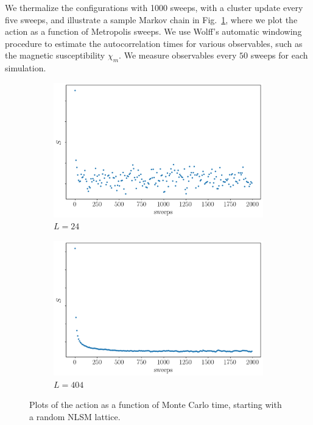 \documentclass[a4paper,11pt]{article}
\begin{document}
We thermalize the configurations with 1000 sweeps, with a cluster update every five sweeps, and illustrate a sample Markov chain in Fig.~\ref{fig:therm}, where we plot the action as a function of Metropolis sweeps. We use Wolff's automatic windowing procedure \cite{wolff2007} to estimate the autocorrelation times for various observables, such as the magnetic susceptibility $\chi_m$. We measure observables every $50$ sweeps for each simulation.
\begin{figure}[h]
  \centering
      \begin{subfigure}[b]{0.5\textwidth}\centering
        \includegraphics[width=\textwidth]{therm24.png}
        \caption{$L=24$}
      \end{subfigure}%
      \hfill
      \begin{subfigure}[b]{0.5\textwidth}\centering
        \includegraphics[width=\textwidth]{therm404.png}
        \caption{$L=404$}
      \end{subfigure}
      \hfill
      \caption{\label{fig:therm} Plots of the action as a function of Monte Carlo time, starting with a random NLSM lattice.}
\end{figure}
\end{document}
